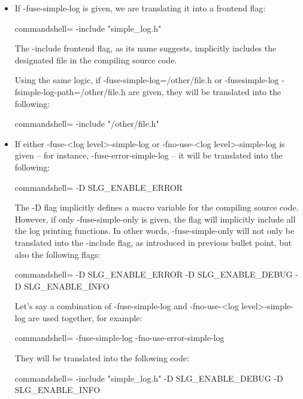 \begin{itemize}
\item If -fuse-simple-log is given, we are translating it into a frontend flag:

\begin{tcblisting}{commandshell={}}
-include "simple_log.h"
\end{tcblisting}

The -include frontend flag, as its name suggests, implicitly includes the designated file in the compiling source code. 

Using the same logic, if -fuse-simple-log=/other/file.h or -fusesimple-log -fsimple-log-path=/other/file.h are given, they will be translated into the following:

\begin{tcblisting}{commandshell={}}
-include "/other/file.h"
\end{tcblisting}

\item If either -fuse-<log level>-simple-log or -fno-use-<log level>-simple-log is given – for instance, -fuse-error-simple-log – it will be translated into the following:

\begin{tcblisting}{commandshell={}}
-D SLG_ENABLE_ERROR
\end{tcblisting}

The -D flag implicitly defines a macro variable for the compiling source code. However, if only -fuse-simple-only is given, the flag will implicitly include all the log printing functions. In other words, -fuse-simple-only will not only be translated into the -include flag, as introduced in previous bullet point, but also the following flags:

\begin{tcblisting}{commandshell={}}
-D SLG_ENABLE_ERROR -D SLG_ENABLE_DEBUG -D SLG_ENABLE_INFO
\end{tcblisting}

Let's say a combination of -fuse-simple-log and -fno-use-<log level>-simple-log are used together, for example:

\begin{tcblisting}{commandshell={}}
-fuse-simple-log -fno-use-error-simple-log
\end{tcblisting}

They will be translated into the following code:

\begin{tcblisting}{commandshell={}}
-include "simple_log.h" -D SLG_ENABLE_DEBUG -D SLG_ENABLE_INFO
\end{tcblisting}


\end{itemize}
